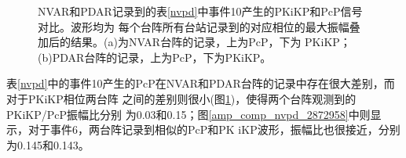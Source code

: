 \begin{figure}[!ht]
	\hfill{}
	\hfill{}
	\hfill{}
	\caption{NVAR和PDAR记录到的表\ref{nvpd}中事件10产生的PKiKP和PcP信号对比。波形均为%
每个台阵所有台站记录到的对应相位的最大振幅叠加后的结果。(a)为NVAR台阵的记录，上为PcP，下为%
PKiKP；(b)PDAR台阵的记录，上为PcP，下为PKiKP。}
	\label{amp_comp_nvpd_4371355}
\end{figure}
	
表\ref{nvpd}中的事件10产生的PcP在NVAR和PDAR台阵的记录中存在很大差别，而对于PKiKP相位两台阵
之间的差别则很小(图\ref{amp_comp_nvpd_4371355})，使得两个台阵观测到的PKiKP/PcP振幅比分别
为0.03和0.15；图\ref{amp_comp_nvpd_2872958}中则显示，对于事件6，两台阵记录到相似的PcP和PK
iKP波形，振幅比也很接近，分别为0.145和0.143。

